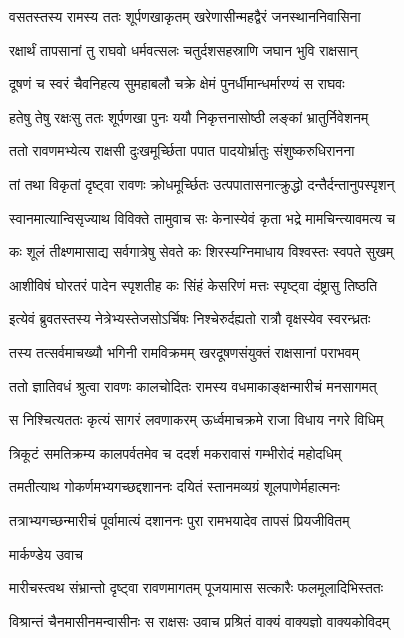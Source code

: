 \twolineshloka
{वसतस्तस्य रामस्य ततः शूर्पणखाकृतम्}
{खरेणासीन्महद्वैरं जनस्थाननिवासिना}


\twolineshloka
{रक्षार्थं तापसानां तु राघवो धर्मवत्सलः}
{चतुर्दशसहस्राणि जघान भुवि राक्षसान्}


\twolineshloka
{दूषणं च स्वरं चैवनिहत्य सुमहाबलौ}
{चक्रे क्षेमं पुनर्धीमान्धर्मारण्यं स राघवः}


\twolineshloka
{हतेषु तेषु रक्षःसु ततः शूर्पणखा पुनः}
{ययौ निकृत्तनासोष्ठी लङ्कां भ्रातुर्निवेशनम्}


\twolineshloka
{ततो रावणमभ्येत्य राक्षसी दुःखमूर्च्छिता}
{पपात पादयोर्भ्रातुः संशुष्करुधिरानना}


\twolineshloka
{तां तथा विकृतां दृष्ट्वा रावणः क्रोधमूर्च्छितः}
{उत्पपातासनात्क्रुद्धो दन्तैर्दन्तानुपस्पृशन्}


\twolineshloka
{स्वानमात्यान्विसृज्याथ विविक्ते तामुवाच सः}
{केनास्येवं कृता भद्रे मामचिन्त्यावमत्य च}


\twolineshloka
{कः शूलं तीक्ष्णमासाद्य सर्वगात्रेषु सेवते}
{कः शिरस्यग्निमाधाय विश्वस्तः स्वपते सुखम्}


\twolineshloka
{आशीविषं घोरतरं पादेन स्पृशतीह कः}
{सिंहं केसरिणं मत्तः स्पृष्ट्वा दंष्ट्रासु तिष्ठति}


\twolineshloka
{इत्येवं ब्रुवतस्तस्य नेत्रेभ्यस्तेजसोऽर्चिषः}
{निश्चेरुर्दह्यतो रात्रौ वृक्षस्येव स्वरन्ध्रतः}


\twolineshloka
{तस्य तत्सर्वमाचख्यौ भगिनी रामविक्रमम्}
{खरदूषणसंयुक्तं राक्षसानां पराभवम्}


\twolineshloka
{ततो ज्ञातिवधं श्रुत्वा रावणः कालचोदितः}
{रामस्य वधमाकाङ्क्षन्मारीचं मनसागमत्}


\twolineshloka
{स निश्चित्यततः कृत्यं सागरं लवणाकरम्}
{ऊर्ध्वमाचक्रमे राजा विधाय नगरे विधिम्}


\twolineshloka
{त्रिकूटं समतिक्रम्य कालपर्वतमेव च}
{ददर्श मकरावासं गम्भीरोदं महोदधिम्}


\twolineshloka
{तमतीत्याथ गोकर्णमभ्यगच्छद्दशाननः}
{दयितं स्तानमव्यग्रं शूलपाणेर्महात्मनः}


\twolineshloka
{तत्राभ्यगच्छन्मारीचं पूर्वामात्यं दशाननः}
{पुरा रामभयादेव तापसं प्रियजीवितम्}


\twolineshloka
{मार्कण्डेय उवाच}
{}


\twolineshloka
{मारीचस्त्वथ संभ्रान्तो दृष्ट्वा रावणमागतम्}
{पूजयामास सत्कारैः फलमूलादिभिस्ततः}


\twolineshloka
{विश्रान्तं चैनमासीनमन्वासीनः स राक्षसः}
{उवाच प्रश्रितं वाक्यं वाक्यज्ञो वाक्यकोविदम्}


